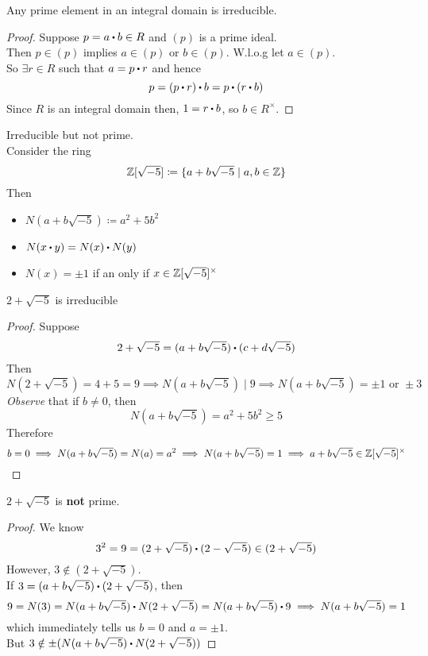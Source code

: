 \documentclass[../Main.tex]{subfiles}
\begin{document}
\begin{prop}[title = Prime elements in integral domain are irreducible]
	Any prime element in an integral domain is irreducible.
\end{prop}
\begin{proof}
	Suppose $p=a\rdot b\in R$ and $(p)$ is a prime ideal.\\
	Then $p\in (p)$ implies $a\in (p)$ or $b\in (p)$. W.l.o.g let $a\in (p)$.\\
	So $\exists r\in R$ such that $a=p\rdot r$ and hence
	\[p=(p\rdot r)\rdot b=p\rdot (r\rdot b)\]
	Since $R$ is an integral domain then, $1=r\rdot b$, so $b\in R^\times $.
\end{proof}
\begin{example}
	Irreducible but not prime.\\
	Consider the ring 
	\[\mathbb{Z}[\sqrt{-5}] \coloneq \{a+b\sqrt{-5}\mid a,b\in \mathbb{Z}\} \]
	Then
	\begin{itemize}
		\item $N(a+b\sqrt{-5}) \coloneqq a^2+5b^2$
		\item $N(x\rdot y)=N(x)\rdot N(y)$
		\item $N(x)=\pm 1$ if an only if $x\in \mathbb{Z}[\sqrt{-5}]^\times$
	\end{itemize}
\end{example}
\begin{claim}
	$2+\sqrt{-5}$ is irreducible
\end{claim}
\begin{proof}
	Suppose 
	\[2+\sqrt{-5}=(a+b\sqrt{-5})\rdot (c+d\sqrt{-5})\]
	Then
	\[N(2+\sqrt{-5}) = 4+5 =9 \implies N(a+b\sqrt{-5})\mid 9 \implies N(a+b\sqrt{-5}) = \pm 1 \text{ or } \pm 3\]
	\textit{Observe} that if $b\ne 0$, then \[N(a+b\sqrt{-5}) = a^2+5b^2\ge 5\]
	Therefore
	\[b=0\implies N(a+b\sqrt{-5})=N(a)=a^2\implies N(a+b\sqrt{-5})=1\implies a+b\sqrt{-5}\in \mathbb{Z}[\sqrt{-5}]^\times\]
\end{proof}
\begin{claim}
	$2+\sqrt{-5}$ is \textbf{not} prime.
\end{claim}
\begin{proof}
	We know
	\[3^2=9=(2+\sqrt{-5})\rdot (2-\sqrt{-5}) \in (2+\sqrt{-5})\]
	However, $3\notin (2+\sqrt{-5})$.\\
	If $3=(a+b\sqrt{-5})\rdot (2+\sqrt{-5})$, then 
	\[9=N(3)=N(a+b\sqrt{-5})\rdot N(2+\sqrt{-5}) =N(a+b\sqrt{-5})\rdot 9 \implies N(a+b\sqrt{-5}) =1 \]
	which immediately tells us $b=0$ and $a=\pm 1$.\\
	But $3\notin \pm (N(a+b\sqrt{-5})\rdot N(2+\sqrt{-5}))$
\end{proof}
\end{document}

